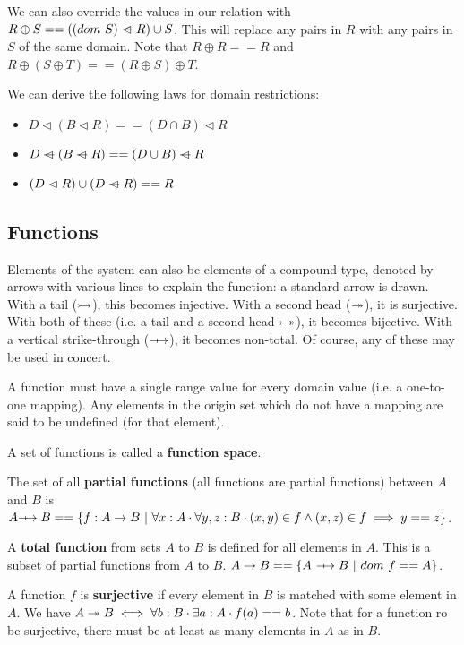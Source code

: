 \documentclass[12pt]{article}
\begin{document}
We can also override the values in our relation with $R \oplus S == ((dom\ S) \ \text{\sout{$\vartriangleleft$}}\ R) \cup S$. This will replace any pairs in $R$ with any pairs in $S$ of the same domain. Note that $R \oplus R == R$ and $R \oplus (S \oplus T) == (R \oplus S) \oplus T$.

We can derive the following laws for domain restrictions:
\begin{itemize}
\item $D \vartriangleleft (B \vartriangleleft R) == (D \cap B) \vartriangleleft R$
\item $D\ \text{\sout{$\vartriangleleft$}}\ (B\ \text{\sout{$\vartriangleleft$}}\ R) == (D \cup B)\ \text{\sout{$\vartriangleleft$}}\ R$
\item $(D \vartriangleleft R) \cup (D\ \text{\sout{$\vartriangleleft$}}\ R) == R$
\end{itemize}

\subsection*{Functions}
Elements of the system can also be elements of a compound type, denoted by arrows with various lines to explain the function: a standard arrow is drawn. With a tail ($\rightarrowtail$), this becomes injective. With a second head ($\twoheadrightarrow$), it is surjective. With both of these (i.e. a tail and a second head $\rightarrowtail\!\!\!\!\!\twoheadrightarrow$), it becomes bijective. With a vertical strike-through ($-\!\!\!\mapsto$), it becomes non-total. Of course, any of these may be used in concert.

A function must have a single range value for every domain value (i.e. a one-to-one mapping). Any elements in the origin set which do not have a mapping are said to be undefined (for that element).

A set of functions is called a {\bf function space}.

The set of all {\bf partial functions} (all functions are partial functions) between $A$ and $B$ is $A -\!\!\!\mapsto B == \{ f : A \rightarrow B \ |\  \forall x : A \cdot \forall y,z : B \cdot (x,y) \in f \land (x,z) \in f \implies y == z \}$.

A {\bf total function} from sets $A$ to $B$ is defined for all elements in $A$. This is a subset of partial functions from $A$ to $B$. $A \rightarrow B == \{ A\ -\!\!\!\mapsto B \ |\  dom\ f == A \}$.

A function $f$ is {\bf surjective} if every element in $B$ is matched with some element in $A$. We have $A \twoheadrightarrow B \iff \forall b : B \cdot \exists a : A \cdot f(a) == b$. Note that for a function ro be surjective, there must be at least as many elements in $A$ as in $B$.
\end{document}
